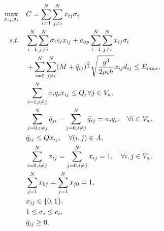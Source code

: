 \documentclass[AutoFakeBold]{LZUThesis}
\begin{document}
\begin{subequations}\label{GRP}
	\begin{align}
		\max_{x_{ij},\sigma_i} \quad & C = \sum^N_{i = 1}\sum^N_{j \neq i} x_{ij}\sigma_i                                                                                                          \\
		\emph{s.t.} \quad            & \sum^N_{i = 1}\sum^N_{j \neq i}\sigma_i e_i x_{ij} + e_{ap}\sum^N_{i=1}\sum^N_{j \neq i} x_{ij}\sigma_i \nonumber                                           \\
		                             & + \sum^N_{i=0}\sum^N_{j \neq i} (M + \bar{q}_{ij})^{\frac{3}{2}}\sqrt{\frac{g^3}{2 \rho \varsigma h}} x_{ij} d_{ij} \leq E_{max}, \label{energy-constraint} \\
		                             & \sum^N_{i=1, i\neq j} \sigma_i q_i x_{ij} \leq Q, \forall j \in V_a,\label{total-load}                                                                      \\
		                             & \sum^N_{j=0, i\neq j}\bar{q}_{ji} -  \sum^N_{j=0, i\neq j}\bar{q}_{ij} = \sigma_i q_i, \label{carry-load} \quad \forall i \in V_a,                          \\
		                             & \bar{q}_{ij} \leq Q x_{ij}, \quad \forall (i,j) \in A, \label{load}                                                                                         \\
		                             & \sum^N_{i=0, i\neq j} x_{ij} = \sum^N_{j=0,i\neq j} x_{ij} = 1, \quad \forall i,j \in V_a, \label{enter-point}                                              \\
		                             & \sum^N_{j=1} x_{0j} = \sum^N_{j=1} x_{j0} = 1, \label{start-point}                                                                                          \\
		                             & x_{ij} \in \{0,1\}, \label{binary-variable}                                                                                                                 \\
		                             & 1 \leq \sigma_i \leq c_i, \label{area-constraint}                                                                                                           \\
		                             & \bar{q}_{ij} \geq 0. \label{flight-weight}
	\end{align}
\end{subequations}
\end{document}
